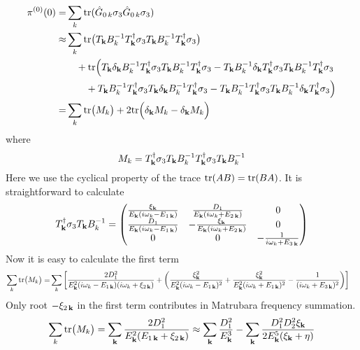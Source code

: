 \begin{equation}\label{eq:pathInt2:pi0}
\begin{split}
\pi^{(0)}(0)=&\sum_k\text{tr}(\hat{G}_{0\,k}\sigma_3\hat{G}_{0\,k}\sigma_3)\\
	\approx&\sum_k\text{tr}\big(T_{\mathbf{k}}B_{k}^{-1}T_{\mathbf{k}}^{\dagger}\sigma_3T_{\mathbf{k}}B_{k}^{-1}T_{\mathbf{k}}^{\dagger}\sigma_3\big)\\
	&\quad+\text{tr}\Big(T_{\mathbf{k}}\delta_{\mathbf{k}}B_{k}^{-1}T_{\mathbf{k}}^{\dagger}\sigma_3T_{\mathbf{k}}B_{k}^{-1}T_{\mathbf{k}}^{\dagger}\sigma_3
	-T_{\mathbf{k}}B_{k}^{-1}\delta_{\mathbf{k}}T_{\mathbf{k}}^{\dagger}\sigma_3T_{\mathbf{k}}B_{k}^{-1}T_{\mathbf{k}}^{\dagger}\sigma_3\\
	&\qquad+T_{\mathbf{k}}B_{k}^{-1}T_{\mathbf{k}}^{\dagger}\sigma_3T_{\mathbf{k}}\delta_{\mathbf{k}}B_{k}^{-1}T_{\mathbf{k}}^{\dagger}\sigma_3
	-T_{\mathbf{k}}B_{k}^{-1}T_{\mathbf{k}}^{\dagger}\sigma_3T_{\mathbf{k}}B_{k}^{-1}\delta_{\mathbf{k}}T_{\mathbf{k}}^{\dagger}\sigma_3\Big)\\
	=&\sum_k\text{tr}\big(M_{k}\big)+2\text{tr}\Big(\delta_{\mathbf{k}}M_{k}-\delta_{\mathbf{k}}M_{k}\Big)
\end{split}
\end{equation}
where 
\begin{equation}
M_{k}=T_{\mathbf{k}}^{\dagger}\sigma_3T_{\mathbf{k}}B_{k}^{-1}T_{\mathbf{k}}^{\dagger}\sigma_3T_{\mathbf{k}}B_{k}^{-1}
\end{equation}
Here we use the cyclical  property of the trace $\text{tr}(AB)=\text{tr}(BA)$.  
It is straightforward to calculate
\begin{equation*}
T_{\mathbf{k}}^{\dagger}\sigma_3T_{\mathbf{k}}B_{k}^{-1}=
\begin{pmatrix}
{\frac{\xi_{\ensuremath{\mathbf{k}}}}{E_{\ensuremath{\mathbf{k}}}(i\omega_{k}-E_{1\,\ensuremath{\mathbf{k}}})}}&\frac{D_{1}}{E_{\mathbf{k}}(i\omega_{k}+E_{2\,\mathbf{k}})}&0\\
{\frac{D_{1}}{E_{\mathbf{k}}(i\omega_{k}-E_{1\,\mathbf{k}})}}&-\frac{\xi_{\mathbf{k}}}{E_{\mathbf{k}}(i\omega_{k}+E_{2\,\mathbf{k}})}&0\\
0&0&-\frac{1}{i\omega_{k}+E_{3\,\mathbf{k}}}\\
\end{pmatrix}
\end{equation*}
Now it is easy to calculate the first term
\begin{equation}
\begin{split}
\sum_k\text{tr}\big(M_{k}\big)=&
\sum_{k}\left[
\frac{2D_{1}^{2}}{E_{\mathbf{k}}^{2}(i\omega_{k}-E_{1\,\mathbf{k}})(i\omega_{k}+\xi_{2\,\mathbf{k}})}+
\left(\frac{\xi_{\mathbf{k}}^{2}}{E_{\mathbf{k}}^{2}(i\omega_{k}-E_{1\,\mathbf{k}})^{2}}+\frac{\xi_{\mathbf{k}}^{2}}{E_{\mathbf{k}}^{2}(i\omega_{k}+E_{1\,\mathbf{k}})^{2}}
-\frac{1}{(i\omega_{k}+E_{3\,\mathbf{k}})^{2}}\right)
\right]
\end{split}
\end{equation}
Only root $-\xi_{2\,\mathbf{k}}$ in the first term contributes in Matrubara frequency summation.
\begin{equation}\label{eq:pathInt2:pi0-1}
\sum_k\text{tr}\big(M_{k}\big)=\sum_{\mathbf{k}}\frac{2D_{1}^{2}}{E_{\mathbf{k}}^{2}(E_{1\,\mathbf{k}}+\xi_{2\,\mathbf{k}})}
\approx\sum_{\mathbf{k}}\frac{D_{1}^{2}}{E_{\mathbf{k}}^{3}}-\sum_{\mathbf{k}}\frac{D_{1}^{2}D_{2}^{2}\xi_{\mathbf{k}}}{2E_{\mathbf{k}}^{5}(\xi_{\mathbf{k}}+\eta)}
\end{equation}

